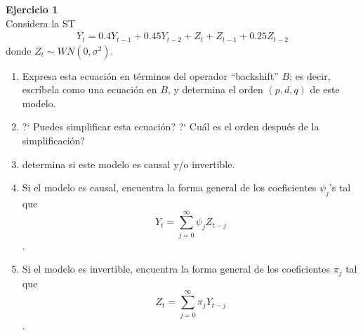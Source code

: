\documentclass[a4paper, 11pt]{article}
\newenvironment{problem}[2][Ejercicio]
{ \begin{mdframed}[backgroundcolor= red!50] \textbf{#1 #2} \\}
	{  \end{mdframed}}
\begin{document}
	\setlength{\parskip}{\medskipamount}
	\setlength{\parindent}{0pt}



\begin{problem}{1} 
    Considera la ST
    \begin{align*}
        Y_t = \text{0.4} Y_{t-1} + \text{0.45}Y_{t-2} + Z_t + Z_{t-1} + \text{0.25}Z_{t-2}
    \end{align*}
    donde $Z_t \sim WN(0,\sigma^2)$.
    \begin{enumerate}
        \item Expresa esta ecuación en términos del operador ``backshift'' $B$; es decir, escríbela como una ecuación en $B$, y determina el orden $(p,d,q)$ de este modelo.
        \item ?` Puedes simplificar esta ecuación? ?` Cuál es el orden después de la simplificación?
        \item determina si este modelo es causal y/o invertible.
        \item Si el modelo es causal, encuentra la forma general de los coeficientes $\psi_j$'s tal que $$Y_t = \sum_{j = 0}^{\infty} \psi_j Z_{t-j}$$.
        \item Si el modelo es invertible, encuentra la forma general de los coeficientes $\pi_j $ tal que $$Z_t = \sum_{j=0}^{\infty} \pi_j Y_{t-j}$$. 
    \end{enumerate}
\end{problem}
\end{document}
